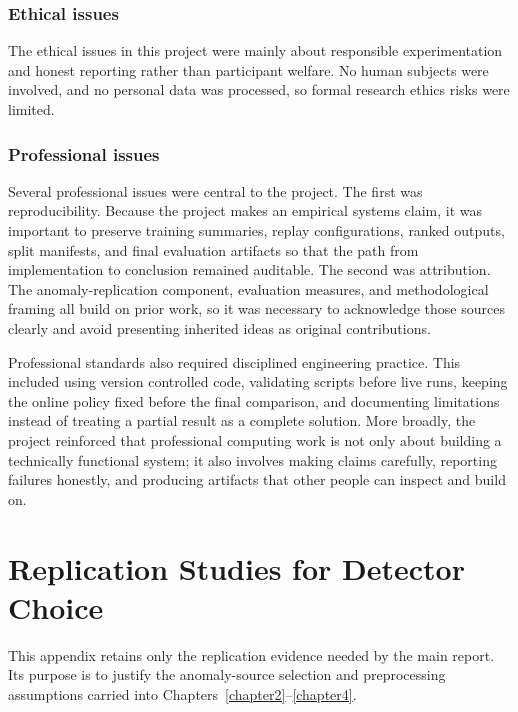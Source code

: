 \begin{appendices}
\subsection{Ethical issues}

The ethical issues in this project were mainly about responsible experimentation and honest reporting rather than participant welfare. No human subjects were involved, and no personal data was processed, so formal research ethics risks were limited.

\subsection{Professional issues}

Several professional issues were central to the project. The first was reproducibility. Because the project makes an empirical systems claim, it was important to preserve training summaries, replay configurations, ranked outputs, split manifests, and final evaluation artifacts so that the path from implementation to conclusion remained auditable. The second was attribution. The anomaly-replication component, evaluation measures, and methodological framing all build on prior work, so it was necessary to acknowledge those sources clearly and avoid presenting inherited ideas as original contributions.

Professional standards also required disciplined engineering practice. This included using version controlled code, validating scripts before live runs, keeping the online policy fixed before the final comparison, and documenting limitations instead of treating a partial result as a complete solution. More broadly, the project reinforced that professional computing work is not only about building a technically functional system; it also involves making claims carefully, reporting failures honestly, and producing artifacts that other people can inspect and build on.


%
%
\chapter{Replication Studies for Detector Choice}
\label{appendixB}

This appendix retains only the replication evidence needed by the main report. Its purpose is to justify the anomaly-source selection and preprocessing assumptions carried into Chapters~\ref{chapter2}--\ref{chapter4}.


\end{appendices}
